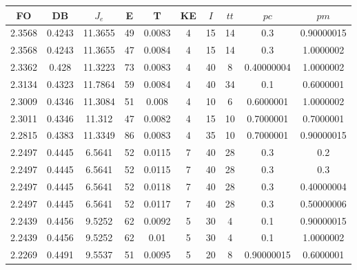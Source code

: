 \begin{table}[h!]
    \footnotesize
    \begin{center}
        \begin{tabular}{|c|c|c|c|c|c|c|c|c|c|}
        \hline
            {\bf FO} & {\bf DB} & $J_e$ & {\bf E} & {\bf T} & {\bf KE} & $I$ & $tt$ & $pc$ & $pm$ \\
        \hline
        \hline
            2.3568 & 0.4243  & 11.3655 & 49 & 0.0083 & 4 & 15 & 14 & 0.3 & 0.90000015\\
        \hline
        \hline
            2.3568 & 0.4243  & 11.3655 & 47 & 0.0084 & 4 & 15 & 14 & 0.3 & 1.0000002\\
        \hline
        \hline
            2.3362 & 0.428  & 11.3223 & 73 & 0.0083 & 4 & 40 & 8 & 0.40000004 & 1.0000002\\
        \hline
        \hline
            2.3134 & 0.4323  & 11.7864 & 59 & 0.0084 & 4 & 40 & 34 & 0.1 & 0.6000001\\
        \hline
        \hline
            2.3009 & 0.4346  & 11.3084 & 51 & 0.008 & 4 & 10 & 6 & 0.6000001 & 1.0000002\\
        \hline
        \hline
            2.3011 & 0.4346  & 11.312 & 47 & 0.0082 & 4 & 15 & 10 & 0.7000001 & 0.7000001\\
        \hline
        \hline
            2.2815 & 0.4383  & 11.3349 & 86 & 0.0083 & 4 & 35 & 10 & 0.7000001 & 0.90000015\\
        \hline
        \hline
            2.2497 & 0.4445  & 6.5641 & 52 & 0.0115 & 7 & 40 & 28 & 0.3 & 0.2\\
        \hline
        \hline
            2.2497 & 0.4445  & 6.5641 & 52 & 0.0115 & 7 & 40 & 28 & 0.3 & 0.3\\
        \hline
        \hline
            2.2497 & 0.4445  & 6.5641 & 52 & 0.0118 & 7 & 40 & 28 & 0.3 & 0.40000004\\
        \hline
        \hline
            2.2497 & 0.4445  & 6.5641 & 52 & 0.0117 & 7 & 40 & 28 & 0.3 & 0.50000006\\
        \hline
        \hline
            2.2439 & 0.4456  & 9.5252 & 62 & 0.0092 & 5 & 30 & 4 & 0.1 & 0.90000015\\
        \hline
        \hline
            2.2439 & 0.4456  & 9.5252 & 62 & 0.01 & 5 & 30 & 4 & 0.1 & 1.0000002\\
        \hline
        \hline
            2.2269 & 0.4491  & 9.5537 & 51 & 0.0095 & 5 & 20 & 8 & 0.90000015 & 0.6000001\\
        \hline
        \hline

\end{tabular}
\end{center}
\end{table}
